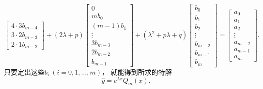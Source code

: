 \begin{enumerate}
\[\begin{bmatrix}
			4\cdot3 b_{m-4} \\ 3\cdot2 b_{m-3} \\ 2\cdot1 b_{m-2}
		\end{bmatrix}
		+ (2\lambda+p)
		\begin{bmatrix}
			0 \\ m b_0 \\ (m-1) b_1 \\ \vdots \\
			3 b_{m-3} \\ 2 b_{m-2} \\ b_{m-1}
		\end{bmatrix}
		+ (\lambda^2+p\lambda+q)
		\begin{bmatrix}
			b_0 \\ b_1 \\ b_2 \\ \vdots \\
			b_{m-2} \\ b_{m-1} \\ b_m
		\end{bmatrix}
		= \begin{bmatrix}
			a_0 \\ a_1 \\ a_2 \\ \vdots \\
			a_{m-2} \\ a_{m-1} \\ a_m
		\end{bmatrix}.
	\]
	只要定出这些\(b_i\ (i=0,1,\dotsc,m)\)，
	就能得到所求的特解\begin{equation}
		\hat{y} = e^{\lambda x} Q_m(x).
	\end{equation}


\end{enumerate}
